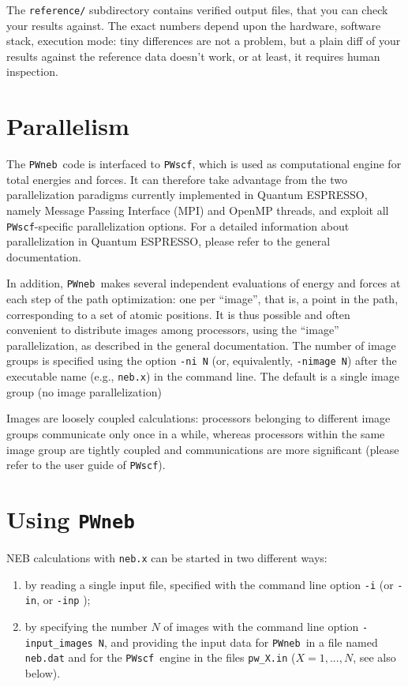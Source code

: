 \documentclass[12pt,a4paper]{article}
\def\qe{{\sc Quantum ESPRESSO}}
\def\NEB{\texttt{PWneb}} %
\def\nebx{\texttt{neb.x}}
\def\PWscf{\texttt{PWscf}}
\begin{document}
The \texttt{reference/} subdirectory contains
verified output files, that you can check your results against.
The exact numbers depend upon the hardware, software stack,
execution mode: tiny differences are not a problem, but
a plain diff of your results against the reference data
doesn't work, or at least, it requires human inspection.

\section{Parallelism}
\label{Sec:para}

The \NEB\ code is interfaced to \PWscf, which is used as computational engine 
for total energies and forces. It can therefore take advantage from the two 
parallelization paradigms currently implemented in \qe, namely
  Message Passing Interface (MPI) and OpenMP threads, and exploit
all \PWscf-specific parallelization options.
For a detailed information about parallelization in \qe, 
please refer to the general documentation.

In addition, \NEB \ makes several independent evaluations
of energy and forces at each step of the path optimization:
one per ``image'', that is, a point in the path, corresponding
to a set of atomic positions.
It is thus possible and often convenient to distribute
images among processors, using the ``image'' parallelization,
as described in the general documentation. The number of image
groups is specified using the option \texttt{-ni N} (or,
equivalently,  \texttt{-nimage N}) after the executable name
(e.g., \nebx) in the command line. The default is a single
image group (no image parallelization)

Images are loosely coupled calculations: processors belonging to
different image groups communicate only once in a while, whereas
processors within the same image group are tightly coupled and 
communications are more significant (please refer to the user
guide of \PWscf).

\section{Using \NEB}

NEB calculations with \texttt{neb.x} can be started in two different ways:
\begin{enumerate}
\item by reading a single input file, specified with the command line 
option \texttt{-i} (or \texttt{-in}, or \texttt{-inp} );
\item by specifying the number $N$ of images with the command line option 
\texttt{-input\_images N}, and providing the input data for \NEB\ in
a file named \texttt{neb.dat} and for the \PWscf\ engine in the files
 \texttt{pw\_X.in} ($X=1,...,N$, see also below).
\end{enumerate}
\end{document}
